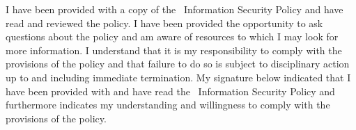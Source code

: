 \documentclass[sec]{policy}
\begin{document}
			I have been provided with a copy of the \theOrganization\ Information Security Policy and have read and reviewed the policy.  I have been provided the opportunity to ask questions about the policy and am aware of resources to which I may look for more information.  I understand that it is my responsibility to comply with the provisions of the policy and that failure to do so is subject to disciplinary action up to and including immediate termination.  My signature below indicated that I have been provided with and have read the \theOrganization\ Information Security Policy and furthermore indicates my understanding and willingness to comply with the provisions of the policy.
		
			\signblock
			
\end{document}
